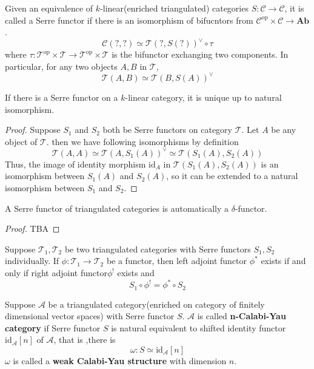 Given an equivalence of $k$-linear(enriched triangulated) categories $S: \mathcal{C} \rightarrow \mathcal{C}$, it is called a Serre functor if there is an isomorphism of bifucntors from $ \mathcal{C}^{\text{op}} \times \mathcal{C} \rightarrow \mathbf{Ab}$.
\[
\mathcal{C}(?,?) \simeq \mathcal{T}(?,S(?))^{\vee} \circ \tau
\]
where $\tau: \mathcal{T}^{\text{op}} \times \mathcal{T} \rightarrow \mathcal{T}^{\text{op}} \times \mathcal{T}$ is the bifunctor  exchanging two components. In particular, for any two objects $A,B$ in $\mathcal{T}$,
\[
\mathcal{T}(A,B) \simeq \mathcal{T}(B,S(A))^{\vee}
\]

\begin{prop}
If there is a Serre functor on a $k$-linear category, it is unique up to natural isomorphism.
\end{prop}
\begin{proof}
Suppose $S_1$ and $S_2$ both be Serre functors on category $\mathcal{T}$. Let $A$ be any object of $\mathcal{T}$. then we have following isomorphisms by definition
\[
\mathcal{T}(A,A) \simeq \mathcal{T}(A, S_1(A))^{\vee} \simeq \mathcal{T}(S_1(A),S_2(A))
\]
Thus, the image of identity morphism $\text{id}_A$ in $\mathcal{T}(S_1(A),S_2(A))$ is an isomorphism between $S_1(A)$ and $S_2(A)$, so it can be extended to a natural isomorphism between $S_1$ and $S_2$.
\end{proof}

\begin{prop}
A Serre functor of triangulated categories is automatically a $\delta $-functor.
\end{prop}
\begin{proof}
TBA
\end{proof}

\begin{prop}
Suppose $\mathcal{T}_1,\mathcal{T}_2$ be two triangulated categories with Serre functors $S_1,S_2$ individually. If $ \phi : \mathcal{T}_1 \rightarrow \mathcal{T}_2$ be a functor, then left adjoint functor $\phi^{*}$ exists if and only if right adjoint functor$\phi^{!}$ exists and 
\[
S_1 \circ \phi^{!} = \phi^{*} \circ S_2
\]
\end{prop}

\begin{mydefn}
Suppose $\mathcal{A}$ be a triangulated category(enriched on category of finitely dimensional vector spaces) with Serre functor $S$. $\mathcal{A}$ is called \textbf{n-Calabi-Yau category} if Serre functor $S$ is natural equivalent to shifted identity functor $\text{id}_{\mathcal{A}}[n]$ of $\mathcal{A}$, that is ,there is 
\[
\omega : S \simeq \text{id}_{\mathcal{A}}[n]
\]
$\omega$ is called a \textbf{weak Calabi-Yau structure} with dimension $n$.
\end{mydefn}